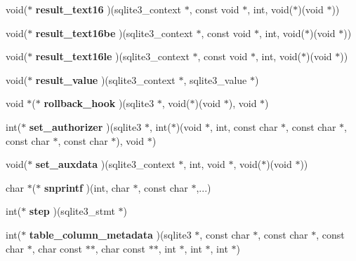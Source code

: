 \begin{CompactItemize}
\item 
void($\ast$ \textbf{result\_\-text16} )(sqlite3\_\-context $\ast$, const void $\ast$, int, void($\ast$)(void $\ast$))\label{structsqlite3__api__routines_49cb3aea6d5e9dbe91bf00454e28195a}

\item 
void($\ast$ \textbf{result\_\-text16be} )(sqlite3\_\-context $\ast$, const void $\ast$, int, void($\ast$)(void $\ast$))\label{structsqlite3__api__routines_cc52777595a2c9eeda5e43f79ace6f3e}

\item 
void($\ast$ \textbf{result\_\-text16le} )(sqlite3\_\-context $\ast$, const void $\ast$, int, void($\ast$)(void $\ast$))\label{structsqlite3__api__routines_110983f2ce7d5ee1a1c80f5ba6a5b340}

\item 
void($\ast$ \textbf{result\_\-value} )(sqlite3\_\-context $\ast$, sqlite3\_\-value $\ast$)\label{structsqlite3__api__routines_11e4fd04208a83ba842fa96762b7f857}

\item 
void $\ast$($\ast$ \textbf{rollback\_\-hook} )(sqlite3 $\ast$, void($\ast$)(void $\ast$), void $\ast$)\label{structsqlite3__api__routines_69ab0f4340fb0cbf7cdc0c089ff8f6ba}

\item 
int($\ast$ \textbf{set\_\-authorizer} )(sqlite3 $\ast$, int($\ast$)(void $\ast$, int, const char $\ast$, const char $\ast$, const char $\ast$, const char $\ast$), void $\ast$)\label{structsqlite3__api__routines_c679926d70c6e29d4dba3f06f4c5eb4b}

\item 
void($\ast$ \textbf{set\_\-auxdata} )(sqlite3\_\-context $\ast$, int, void $\ast$, void($\ast$)(void $\ast$))\label{structsqlite3__api__routines_0de2a233e569fb5892365cf016b73b0d}

\item 
char $\ast$($\ast$ \textbf{snprintf} )(int, char $\ast$, const char $\ast$,...)\label{structsqlite3__api__routines_92e1be60503dfef206002fb8fa3586b2}

\item 
int($\ast$ \textbf{step} )(sqlite3\_\-stmt $\ast$)\label{structsqlite3__api__routines_3a5f5770449dbcccecf49352383a2e30}

\item 
int($\ast$ \textbf{table\_\-column\_\-metadata} )(sqlite3 $\ast$, const char $\ast$, const char $\ast$, const char $\ast$, char const $\ast$$\ast$, char const $\ast$$\ast$, int $\ast$, int $\ast$, int $\ast$)\label{structsqlite3__api__routines_466f3c946ec753ae502783313c64c6ca}


\end{CompactItemize}
